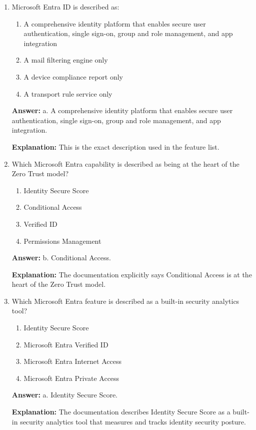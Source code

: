 \documentclass[10pt]{article}
\begin{document}
\begin{enumerate}[leftmargin=*]
\item Microsoft Entra ID is described as:
\begin{enumerate}[label=\alph*., leftmargin=1.5em]
\item A comprehensive identity platform that enables secure user authentication, single sign-on, group and role management, and app integration
\item A mail filtering engine only
\item A device compliance report only
\item A transport rule service only
\end{enumerate}
\textbf{Answer:} a. A comprehensive identity platform that enables secure user authentication, single sign-on, group and role management, and app integration.

\textbf{Explanation:} This is the exact description used in the feature list.

\item Which Microsoft Entra capability is described as being at the heart of the Zero Trust model?
\begin{enumerate}[label=\alph*., leftmargin=1.5em]
\item Identity Secure Score
\item Conditional Access
\item Verified ID
\item Permissions Management
\end{enumerate}
\textbf{Answer:} b. Conditional Access.

\textbf{Explanation:} The documentation explicitly says Conditional Access is at the heart of the Zero Trust model.

\item Which Microsoft Entra feature is described as a built-in security analytics tool? 
\begin{enumerate}[label=\alph*., leftmargin=1.5em]
\item Identity Secure Score
\item Microsoft Entra Verified ID
\item Microsoft Entra Internet Access
\item Microsoft Entra Private Access
\end{enumerate}
\textbf{Answer:} a. Identity Secure Score.

\textbf{Explanation:} The documentation describes Identity Secure Score as a built-in security analytics tool that measures and tracks identity security posture.


\end{enumerate}
\end{document}

